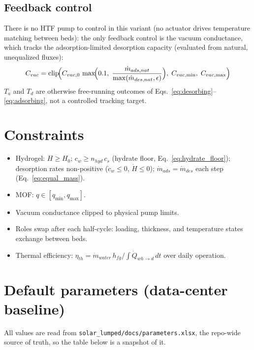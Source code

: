 \documentclass[11pt]{article}
\begin{document}
\subsection{Feedback control}

There is no HTF pump to control in this variant (no actuator drives temperature matching between beds): the only feedback control is the vacuum conductance, which tracks the adsorption-limited desorption capacity (evaluated from natural, unequalized fluxes):
\begin{equation}
C_{vac} = \mathrm{clip}\!\Bigl(
C_{vac,0}\,\max\!\Bigl(0.1,\; \frac{\dot{m}_{ads,nat}}{\max(\dot{m}_{des,nat}, \epsilon)}\Bigr),\;
C_{vac,\min},\; C_{vac,\max}\Bigr)
\label{eq:ctrl_cvac}
\end{equation}
$T_a$ and $T_d$ are otherwise free-running outcomes of Eqs.~\eqref{eq:desorbing}--\eqref{eq:adsorbing}, not a controlled tracking target.

\section{Constraints}

\begin{itemize}
\item Hydrogel: $H \ge H_0$; $c_w \ge n_{hyd}\,c_s$ (hydrate floor, Eq.~\eqref{eq:hydrate_floor}); desorption rates non-positive ($\dot{c}_w \le 0$, $\dot{H} \le 0$); $\dot{m}_{ads} = \dot{m}_{des}$ each step (Eq.~\eqref{eq:equal_mass}).
\item MOF: $q \in [q_{\min}, q_{\max}]$.
\item Vacuum conductance clipped to physical pump limits.
\item Roles swap after each half-cycle: loading, thickness, and temperature states exchange between beds.
\item Thermal efficiency: $\eta_{th} = \dot{m}_{water}\,h_{fg} / \int \dot{Q}_{wh\to d}\,dt$ over daily operation.
\end{itemize}

\section{Default parameters (data-center baseline)}

All values are read from \texttt{solar\_lumped/docs/parameters.xlsx}, the repo-wide source of truth, so the table below is a snapshot of it.
\end{document}
